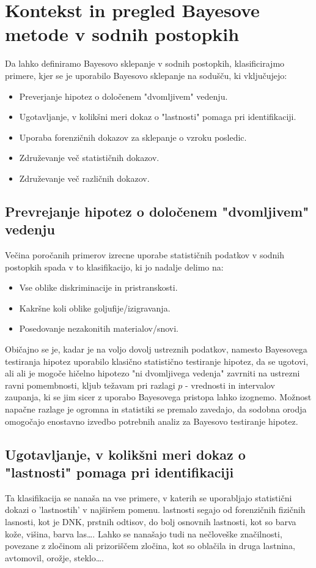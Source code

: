 \documentclass[a4paper,12pt]{article}
\begin{document}
\section{Kontekst in pregled Bayesove metode v sodnih postopkih}
Da lahko definiramo Bayesovo sklepanje v sodnih postopkih, klasificirajmo primere, kjer se je uporabilo Bayesovo sklepanje na sodušču, 
ki vključujejo:
\begin{itemize}
    \item Preverjanje hipotez o določenem "dvomljivem" vedenju.
    \item Ugotavljanje, v kolikšni meri dokaz o "lastnosti" pomaga pri identifikaciji.
    \item Uporaba forenzičnih dokazov za sklepanje o vzroku posledic.
    \item Združevanje več statističnih dokazov.
    \item Združevanje več različnih dokazov.
\end{itemize}

\subsection{Prevrejanje hipotez o določenem "dvomljivem" vedenju}
Večina poročanih primerov izrecne uporabe statističnih podatkov v sodnih postopkih spada v to klasifikacijo, ki jo nadalje delimo na:
\begin{itemize}
    \item Vse oblike diskriminacije in pristranskosti.
    \item Kakršne koli oblike goljufije/izigravanja.
    \item Posedovanje nezakonitih materialov/snovi.
\end{itemize}

Običajno se je, kadar je na voljo dovolj ustreznih podatkov, namesto Bayesovega testiranja hipotez uporabilo klasično statistično testiranje 
hipotez, da se ugotovi, ali ali je mogoče hičelno hipotezo "ni dvomljivega vedenja" zavrniti na ustrezni ravni pomembnosti, kljub težavam 
pri razlagi $p$ - vrednosti in intervalov zaupanja, ki se jim sicer z uporabo Bayesovega pristopa lahko izognemo. Možnost napačne 
razlage je ogromna in statistiki se premalo zavedajo, da sodobna orodja omogočajo enostavno izvedbo potrebnih analiz za Bayesovo 
testiranje hipotez.

\subsection{Ugotavljanje, v kolikšni meri dokaz o "lastnosti" pomaga pri identifikaciji}
Ta klasifikacija se nanaša na vse primere, v katerih se uporabljajo statistični dokazi o 'lastnostih' v najširšem pomenu. lastnosti segajo 
od forenzičnih fizičnih lasnosti, kot je DNK, prstnih odtisov, do bolj osnovnih lastnosti, kot so barva kože, višina, barva las\dots. 
Lahko se nanašajo tudi na nečloveške značilnosti, povezane z zločinom ali prizoriščem zločina, kot so oblačila in druga lastnina, 
avtomovil, orožje, steklo\dots. \\ \\
\end{document}
